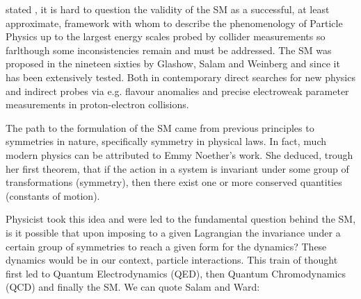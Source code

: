 

 stated , it is hard to question the validity of the SM as a successful, at least approximate, framework with whom to describe the phenomenology of Particle Physics up to the largest energy scales probed by collider measurements so farlthough\Joaoadd{,} some inconsistencies remain and must be addressed.  
%
The SM was proposed in the nineteen sixties by Glashow, Salam and Weinberg  and since  it has been extensively tested. Both in contemporary direct searches for new physics and indirect probes via e.g. flavour anomalies and precise electroweak parameter measurements in proton-electron collisions.  %

The path to the formulation of the SM came from previous principles  to symmetries in nature, specifically symmetry in physical laws. 
%
In fact, much  modern physics can be attributed to Emmy Noether's work. She deduced, trough her first theorem, that if the action in a system is invariant under some group of transformations (symmetry), then there exist one or more conserved quantities (constants of motion). 

Physicist took this idea and were led to the fundamental question behind the SM, is it possible that upon imposing to a given Lagrangian the invariance under a certain group of symmetries to reach a given form for  the dynamics? 
%
These dynamics would be in our context, particle interactions. This train of thought first led to Quantum Electrodynamics (QED), then Quantum Chromodynamics (QCD) and finally the SM.  
%
We can quote Salam and Ward: %

